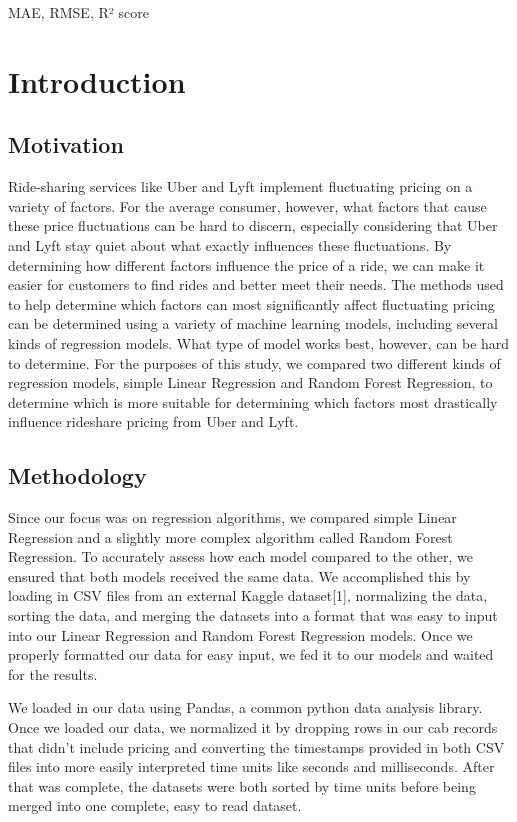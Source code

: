 \documentclass[conference]{IEEEtran}
\begin{document}
\begin{IEEEkeywords}
MAE, RMSE, R² score
\end{IEEEkeywords}

\section{Introduction}
\subsection{Motivation}
Ride-sharing services like Uber and Lyft implement fluctuating pricing on a variety of factors. For the average consumer, however, what factors that cause these price fluctuations can be hard to discern, especially considering that Uber and Lyft stay quiet about what exactly influences these fluctuations. By determining how different factors influence the price of a ride, we can make it easier for customers to find rides and better meet their needs. The methods used to help determine which factors can most significantly affect fluctuating pricing can be determined using a variety of machine learning models, including several kinds of regression models. What type of model works best, however, can be hard to determine. For the purposes of this study, we compared two different kinds of regression models, simple Linear Regression and Random Forest Regression, to determine which is more suitable for determining which factors most drastically influence rideshare pricing from Uber and Lyft.
\subsection{Methodology}
Since our focus was on regression algorithms, we compared simple Linear Regression and a slightly more complex algorithm called Random Forest Regression. To accurately assess how each model compared to the other, we ensured that both models received the same data. We accomplished this by loading in CSV files from an external Kaggle dataset[1], normalizing the data, sorting the data, and merging the datasets into a format that was easy to input into our Linear Regression and Random Forest Regression models. Once we properly formatted our data for easy input, we fed it to our models and waited for the results.

We loaded in our data using Pandas, a common python data analysis library. Once we loaded our data, we normalized it by dropping rows in our cab records that didn't include pricing and converting the timestamps provided in both CSV files into more easily interpreted time units like seconds and milliseconds. After that was complete, the datasets were both sorted by time units before being merged into one complete, easy to read dataset.
\end{document}
